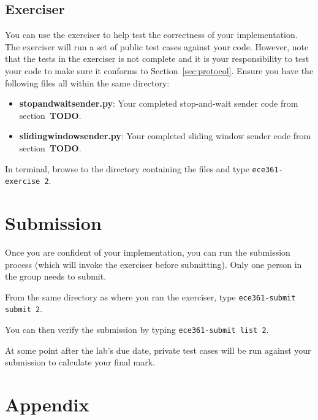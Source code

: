 \documentclass[11pt]{article}
\def\thelab{2}
\begin{document}
\subsection{Exerciser}
\label{sec:exercise}
You can use the exerciser to help test the correctness of your implementation. The exerciser will run a set of public test cases against your code. However, note that the tests in the exerciser is not complete and it is your responsibility to test your code to make sure it conforms to Section~\ref{sec:protocol}.
Ensure you have the following files all within the same directory:
\begin{itemize}
    \item \textbf{stopandwaitsender.py}: Your completed stop-and-wait sender code from section~\textbf{TODO}.
    \item \textbf{slidingwindowsender.py}: Your completed sliding window sender code from section~\textbf{TODO}.
\end{itemize}

In terminal, browse to the directory containing the files and type \texttt{ece361-exercise \thelab}.


\section{Submission}
\label{sec:submission}
Once you are confident of your implementation, you can run the submission process (which will invoke the exerciser before submitting).
Only one person in the group needs to submit.

From the same directory as where you ran the exerciser, type \texttt{ece361-submit submit \thelab}.

You can then verify the submission by typing \texttt{ece361-submit list \thelab}.

At some point after the lab's due date, private test cases will be run against your submission to calculate your final mark.

\newpage
\appendix
\section{Appendix}
\label{sec:appendix}
\end{document}
